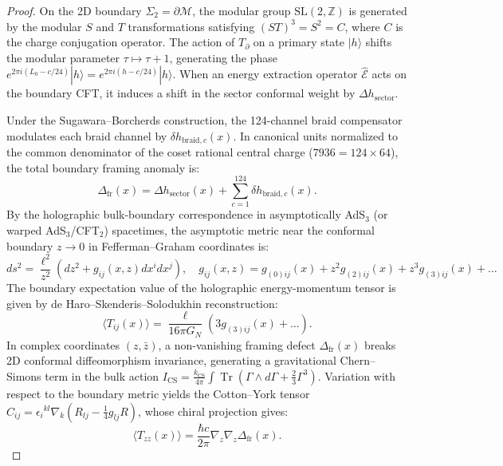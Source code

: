 \documentclass[11pt,onecolumn]{article}
\DeclareMathOperator{\Tr}{Tr}
\begin{document}
\begin{proof}
On the 2D boundary $\Sigma_2 = \partial\mathcal{M}$, the modular group $\mathrm{SL}(2, \mathbb{Z})$ is generated by the modular $S$ and $T$ transformations satisfying $(ST)^3 = S^2 = C$, where $C$ is the charge conjugation operator. The action of $T_\partial$ on a primary state $|h\rangle$ shifts the modular parameter $\tau \mapsto \tau + 1$, generating the phase $e^{2\pi i (L_0 - c/24)} |h\rangle = e^{2\pi i (h - c/24)} |h\rangle$. When an energy extraction operator $\hat{\mathcal{E}}$ acts on the boundary CFT, it induces a shift in the sector conformal weight by $\Delta h_{\text{sector}}$.

Under the Sugawara--Borcherds construction, the 124-channel braid compensator modulates each braid channel by $\delta h_{\text{braid}, c}(x)$. In canonical units normalized to the common denominator of the coset rational central charge ($7936 = 124 \times 64$), the total boundary framing anomaly is:
\begin{equation}
\Delta_{\text{fr}}(x) = \Delta h_{\text{sector}}(x) + \sum_{c=1}^{124} \delta h_{\text{braid}, c}(x).
\end{equation}
By the holographic bulk-boundary correspondence in asymptotically AdS$_3$ (or warped AdS$_3$/CFT$_2$) spacetimes, the asymptotic metric near the conformal boundary $z \to 0$ in Fefferman--Graham coordinates is:
\begin{equation}
ds^2 = \frac{\ell^2}{z^2} \left( dz^2 + g_{ij}(x, z) dx^i dx^j \right), \quad g_{ij}(x, z) = g_{(0)ij}(x) + z^2 g_{(2)ij}(x) + z^3 g_{(3)ij}(x) + \dots
\end{equation}
The boundary expectation value of the holographic energy-momentum tensor is given by de Haro--Skenderis--Solodukhin reconstruction:
\begin{equation}
\langle T_{ij}(x) \rangle = \frac{\ell}{16\pi G_N} \left( 3 g_{(3)ij}(x) + \dots \right).
\end{equation}
In complex coordinates $(z, \bar{z})$, a non-vanishing framing defect $\Delta_{\text{fr}}(x)$ breaks 2D conformal diffeomorphism invariance, generating a gravitational Chern--Simons term in the bulk action $I_{\text{CS}} = \frac{k_{\text{CS}}}{4\pi} \int \Tr\left(\Gamma \wedge d\Gamma + \frac{2}{3} \Gamma^3\right)$. Variation with respect to the boundary metric yields the Cotton--York tensor $C_{ij} = \epsilon_i{}^{kl} \nabla_k \left( R_{lj} - \frac{1}{4} g_{lj} R \right)$, whose chiral projection gives:
\begin{equation}
\langle T_{zz}(x) \rangle = \frac{\hbar c}{2\pi} \nabla_z\nabla_z \Delta_{\text{fr}}(x).

\end{equation}
\end{proof}
\end{document}
